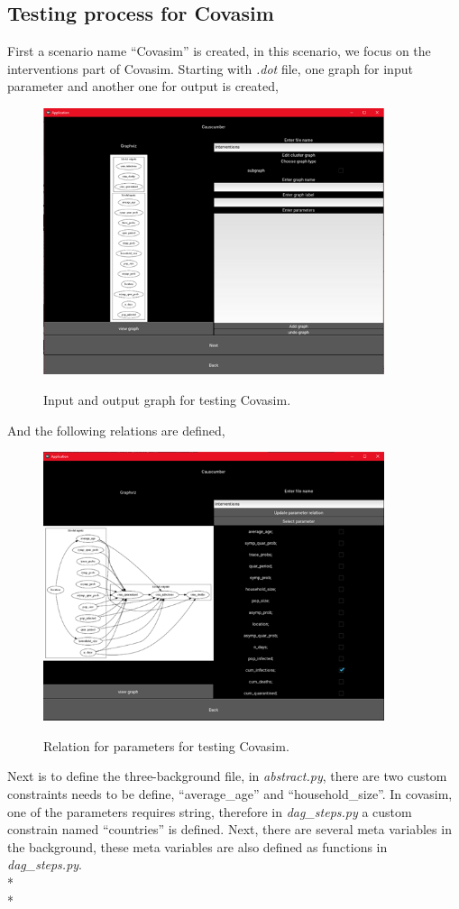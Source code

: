 \subsection{Testing process for Covasim}
First a scenario name “Covasim” is created, in this scenario, we focus on the interventions part of Covasim. Starting with \textsl{.dot} file, one graph for input parameter and another one for output is created, 
\begin{figure}[H]
	\centering
	\includegraphics[width=10cm]{figures/CovasimTestProcess1.png}\\
	\caption{Input and output graph for testing Covasim.}
	\label{fig:figure34}
\end{figure}
And the following relations are defined,
\begin{figure}[H]
	\centering
	\includegraphics[width=10cm]{figures/CovasimTestProcess2.png}\\
	\caption{Relation for parameters for testing Covasim.}
	\label{fig:figure35}
\end{figure}
Next is to define the three-background file, in \textsl{abstract.py}, there are two custom constraints needs to be define, “average\_age” and “household\_size”. In covasim, one of the parameters requires string, therefore in \textsl{dag\_steps.py} a custom constrain named “countries” is defined. Next, there are several meta variables in the background, these meta variables are also defined as functions in \textsl{dag\_steps.py}. \\*\\*
